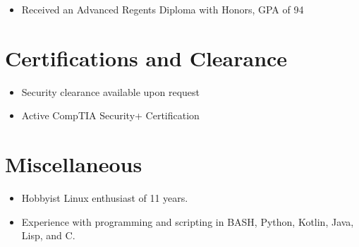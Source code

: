 \documentclass[11pt]{resume}
\begin{document}


\begin{itemize}
\item Received an Advanced Regents Diploma with Honors, GPA of 94
\end{itemize}

\section{Certifications and Clearance}
\begin{itemize}
\item Security clearance available upon request
\item Active CompTIA Security+ Certification
\end{itemize}

\section{Miscellaneous}
\begin{itemize}
\item Hobbyist Linux enthusiast of 11 years.
\item Experience with programming and scripting in BASH, Python, Kotlin, Java, Lisp, and C.
\end{itemize}
\end{document}

